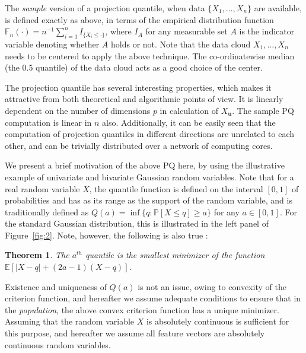 \documentclass[twoside]{article}
\newtheorem{Theorem}{Theorem}[section]
\begin{document}
The {\it sample} version of a projection 
quantile, when data $\{ X_{1}, \ldots, X_{n} \}$ are available, is defined 
exactly as above, in terms of the empirical distribution function 
$\mathbb{F}_{n} (\cdot) = n^{-1} \sum_{i=1}^{n} I_{\{ X_{i} \leq \cdot \}}$, where 
$I_{A}$ for any measurable set $A$ is the indicator variable denoting whether $A$ holds
or not. 
Note that the data cloud ${X}_{1}, \ldots, {X}_{n}$ needs to be centered 
to apply the above technique. 
 The co-ordinatewise median (the 0.5 quantile) of the data cloud acts as a good choice of the center. 
 
The projection quantile has several interesting properties, which makes it 
attractive from both theoretical and algorithmic points of view. 
It is  linearly 
dependent on the number of dimensions $p$  in 
calculation of ${X}_\mathbf{u}$. The sample PQ computation is linear in $n$ also. 
Additionally, it can be easily seen that the computation of projection quantiles 
in different directions are unrelated to each other, and can be trivially distributed
over a network of computing cores. 

We present a brief motivation of the above PQ here, by using the illustrative example of 
univariate and bivariate Gaussian random variables. Note that for a real random 
variable $X$, 
the quantile function is defined on the interval $[0, 1]$ of probabilities and has as 
its range as the support of the random variable, and is traditionally defined as 
$Q (a) = \inf \{ q: \mathbb{P} [ X \leq q ] \geq a \}$ for any $a \in [0,1]$. For the 
standard Gaussian distribution, this is illustrated in the left panel of 
Figure~\ref{fig:2}. Note, however, the following is also true 
\cite{Ferguson67, Chaudhuri96}:

\begin{Theorem} 
The $a^{th}$ quantile is the smallest minimizer of the function 
$\mathbb{E} \left[ | X - q| + (2 a - 1) (X - q) \right]$. 
\end{Theorem} 

Existence and uniqueness of $Q (a)$ is not an issue, owing to convexity of the 
criterion function, and hereafter we assume adequate conditions to ensure that in
the {\it population}, the above convex criterion function has a unique minimizer. 
Assuming that the random variable $X$ is absolutely continuous is sufficient 
for this purpose, and hereafter we assume all feature vectors are absolutely continuous 
random variables.
\end{document}
